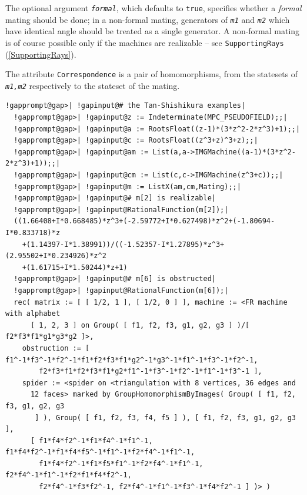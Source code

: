 \documentclass[a4paper,11pt]{report}
\begin{document}
{{{ The optional argument \mbox{\texttt{\mdseries\slshape formal}}, which defaults to \texttt{true}, specifies whether a \emph{formal} mating should be done; in a non-formal mating, generators of \mbox{\texttt{\mdseries\slshape m1}} and \mbox{\texttt{\mdseries\slshape m2}} which have identical angle should be treated as a single generator. A
non-formal mating is of course possible only if the machines are realizable --
see \texttt{SupportingRays} (\ref{SupportingRays}). 

 The attribute \texttt{Correspondence} is a pair of homomorphisms, from the statesets of \mbox{\texttt{\mdseries\slshape m1,m2}} respectively to the stateset of the mating. 
\begin{Verbatim}[commandchars=!@|,fontsize=\small,frame=single,label=Example]
  !gapprompt@gap>| !gapinput@# the Tan-Shishikura examples|
  !gapprompt@gap>| !gapinput@z := Indeterminate(MPC_PSEUDOFIELD);;|
  !gapprompt@gap>| !gapinput@a := RootsFloat((z-1)*(3*z^2-2*z^3)+1);;|
  !gapprompt@gap>| !gapinput@c := RootsFloat((z^3+z)^3+z);;|
  !gapprompt@gap>| !gapinput@am := List(a,a->IMGMachine((a-1)*(3*z^2-2*z^3)+1));;|
  !gapprompt@gap>| !gapinput@cm := List(c,c->IMGMachine(z^3+c));;|
  !gapprompt@gap>| !gapinput@m := ListX(am,cm,Mating);;|
  !gapprompt@gap>| !gapinput@# m[2] is realizable|
  !gapprompt@gap>| !gapinput@RationalFunction(m[2]);|
  ((1.66408+I*0.668485)*z^3+(-2.59772+I*0.627498)*z^2+(-1.80694-I*0.833718)*z
    +(1.14397-I*1.38991))/((-1.52357-I*1.27895)*z^3+(2.95502+I*0.234926)*z^2
    +(1.61715+I*1.50244)*z+1)
  !gapprompt@gap>| !gapinput@# m[6] is obstructed|
  !gapprompt@gap>| !gapinput@RationalFunction(m[6]);|
  rec( matrix := [ [ 1/2, 1 ], [ 1/2, 0 ] ], machine := <FR machine with alphabet
      [ 1, 2, 3 ] on Group( [ f1, f2, f3, g1, g2, g3 ] )/[ f2*f3*f1*g1*g3*g2 ]>,
    obstruction := [ f1^-1*f3^-1*f2^-1*f1*f2*f3*f1*g2^-1*g3^-1*f1^-1*f3^-1*f2^-1,
        f2*f3*f1*f2*f3*f1*g2*f1^-1*f3^-1*f2^-1*f1^-1*f3^-1 ],
    spider := <spider on <triangulation with 8 vertices, 36 edges and
      12 faces> marked by GroupHomomorphismByImages( Group( [ f1, f2, f3, g1, g2, g3
       ] ), Group( [ f1, f2, f3, f4, f5 ] ), [ f1, f2, f3, g1, g2, g3 ],
      [ f1*f4*f2^-1*f1*f4^-1*f1^-1, f1*f4*f2^-1*f1*f4*f5^-1*f1^-1*f2*f4^-1*f1^-1,
        f1*f4*f2^-1*f1*f5*f1^-1*f2*f4^-1*f1^-1, f2*f4^-1*f1^-1*f2*f1*f4*f2^-1,
        f2*f4^-1*f3*f2^-1, f2*f4^-1*f1^-1*f3^-1*f4*f2^-1 ] )> )
\end{Verbatim}
 }

 

}}
\end{document}
